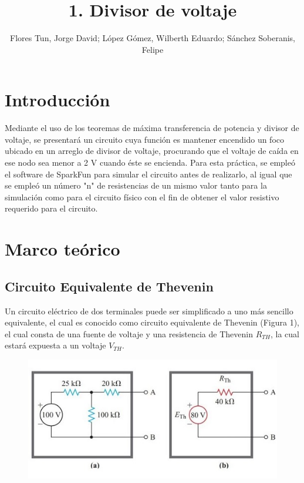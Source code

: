 \documentclass[]{article}
\title{1. Divisor de voltaje}
\author{Flores Tun, Jorge David; López Gómez, Wilberth Eduardo; Sánchez Soberanis, Felipe}
\begin{document}
\maketitle

\section{Introducción}

Mediante el uso de los teoremas de máxima transferencia de potencia y divisor de voltaje, se presentará un circuito cuya función es mantener encendido un foco ubicado en un 
arreglo de divisor de voltaje, procurando que el voltaje de caída en ese nodo sea menor a 2 V cuando éste se encienda. Para esta práctica, se empleó el software de SparkFun para 
simular el circuito antes de realizarlo, al igual que se empleó un número "n" de resistencias de un mismo valor tanto para la simulación como para el circuito físico con el fin de 
obtener el valor resistivo requerido para el circuito.

\section{Marco teórico}

\subsection{Circuito Equivalente de Thevenin}

Un circuito eléctrico de dos terminales puede ser simplificado a uno más sencillo equivalente, el cual es conocido como circuito equivalente de Thevenin (Figura 1), 
el cual consta de una fuente de voltaje y una resistencia de Thevenin $R_{TH}$, la cual estará expuesta a un voltaje $V_{TH}$. 

\begin{figure}
    \centering
    \includegraphics{build/Imagenes/CircuitoTH.jpg}
\end{figure}
\end{document}
